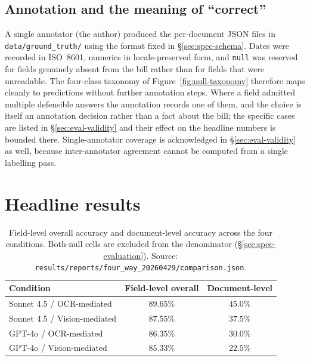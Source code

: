 \subsection{Annotation and the meaning of ``correct''}
\label{sec:eval-dataset-annotation}

A single annotator (the author) produced the per-document JSON files
in \texttt{data/ground\_truth/} using the format fixed in
\S\ref{sec:spec-schema}. Dates were recorded in ISO~8601, numerics
in locale-preserved form, and \texttt{null} was reserved for fields
genuinely absent from the bill rather than for fields that were
unreadable. The four-class taxonomy of
Figure~\ref{fig:null-taxonomy} therefore maps cleanly to predictions
without further annotation steps. Where a field admitted multiple
defensible answers the annotation records one of them, and the
choice is itself an annotation decision rather than a fact about the
bill; the specific cases are listed in \S\ref{sec:eval-validity} and
their effect on the headline numbers is bounded there.
Single-annotator coverage is acknowledged in
\S\ref{sec:eval-validity} as well, because inter-annotator agreement
cannot be computed from a single labelling pass.

\section{Headline results}
\label{sec:eval-headline}

\begin{table}[ht]
    \centering
    \caption{Field-level overall accuracy and document-level accuracy
    across the four conditions. Both-null cells are excluded from the
    denominator (\S\ref{sec:spec-evaluation}). Source:
    \texttt{results/reports/four\_way\_20260429/comparison.json}.}
    \label{tab:eval-headline}
    \begin{tabular}{lcc}
        \hline
        Condition & Field-level overall & Document-level \\
        \hline
        Sonnet 4.5 / OCR-mediated     & $89.65\%$ & $45.0\%$ \\
        Sonnet 4.5 / Vision-mediated  & $87.55\%$ & $37.5\%$ \\
        GPT-4o / OCR-mediated         & $86.35\%$ & $30.0\%$ \\
        GPT-4o / Vision-mediated      & $85.33\%$ & $22.5\%$ \\
        \hline
    \end{tabular}
\end{table}

